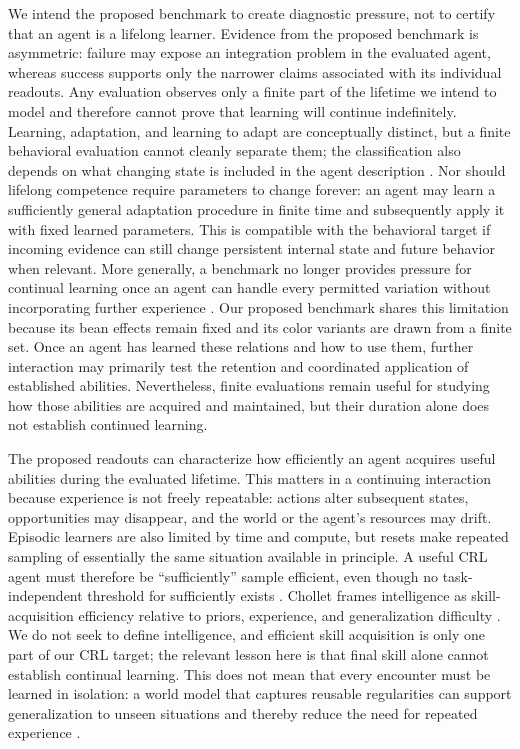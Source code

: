 \documentclass[10pt,journal,compsoc]{IEEEtran}
\begin{document}
We intend the proposed benchmark to create diagnostic pressure, not to certify that an agent is a lifelong learner.
Evidence from the proposed benchmark is asymmetric: failure may expose an integration problem in the evaluated agent, whereas success supports only the narrower claims associated with its individual readouts.
Any evaluation observes only a finite part of the lifetime we intend to model and therefore cannot prove that learning will continue indefinitely.
Learning, adaptation, and learning to adapt are conceptually distinct, but a finite behavioral evaluation cannot cleanly separate them; the classification also depends on what changing state is included in the agent description \cite{abel2023}.
Nor should lifelong competence require parameters to change forever: an agent may learn a sufficiently general adaptation procedure in finite time and subsequently apply it with fixed learned parameters.
This is compatible with the behavioral target if incoming evidence can still change persistent internal state and future behavior when relevant.
More generally, a benchmark no longer provides pressure for continual learning once an agent can handle every permitted variation without incorporating further experience \cite{elelimy2025}.
Our proposed benchmark shares this limitation because its bean effects remain fixed and its color variants are drawn from a finite set.
Once an agent has learned these relations and how to use them, further interaction may primarily test the retention and coordinated application of established abilities.
Nevertheless, finite evaluations remain useful for studying how those abilities are acquired and maintained, but their duration alone does not establish continued learning.

The proposed readouts can characterize how efficiently an agent acquires useful abilities during the evaluated lifetime.
This matters in a continuing interaction because experience is not freely repeatable: actions alter subsequent states, opportunities may disappear, and the world or the agent's resources may drift.
Episodic learners are also limited by time and compute, but resets make repeated sampling of essentially the same situation available in principle.
A useful CRL agent must therefore be ``sufficiently'' sample efficient, even though no task-independent threshold for sufficiently exists \cite{naik2019,abel2023}.
Chollet frames intelligence as skill-acquisition efficiency relative to priors, experience, and generalization difficulty \cite{chollet2019}.
We do not seek to define intelligence, and efficient skill acquisition is only one part of our CRL target; the relevant lesson here is that final skill alone cannot establish continual learning.
This does not mean that every encounter must be learned in isolation: a world model that captures reusable regularities can support generalization to unseen situations and thereby reduce the need for repeated experience \cite{ha2018,hafner2025}.
\end{document}
